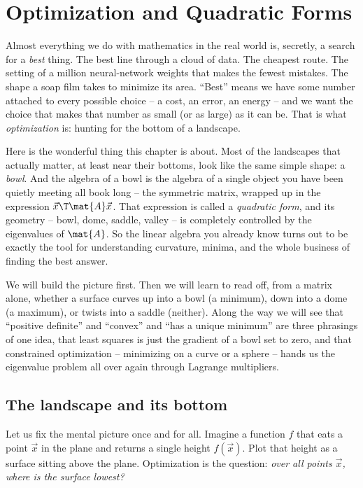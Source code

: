 \chapter{Optimization and Quadratic Forms}

Almost everything we do with mathematics in the real world is, secretly, a search
for a \emph{best} thing. The best line through a cloud of data. The cheapest route.
The setting of a million neural-network weights that makes the fewest mistakes. The
shape a soap film takes to minimize its area. ``Best'' means we have some number
attached to every possible choice -- a cost, an error, an energy -- and we want the
choice that makes that number as small (or as large) as it can be. That is what
\emph{optimization} is: hunting for the bottom of a landscape.

Here is the wonderful thing this chapter is about. Most of the landscapes that
actually matter, at least near their bottoms, look like the same simple shape: a
\emph{bowl}. And the algebra of a bowl is the algebra of a single object you have
been quietly meeting all book long -- the symmetric matrix, wrapped up in the
expression $\vec{x}\T\mat{A}\vec{x}$. That expression is called a \emph{quadratic
form}, and its geometry -- bowl, dome, saddle, valley -- is completely controlled by
the eigenvalues of $\mat{A}$. So the linear algebra you already know turns out to be
exactly the tool for understanding curvature, minima, and the whole business of
finding the best answer.

We will build the picture first. Then we will learn to read off, from a matrix
alone, whether a surface curves up into a bowl (a minimum), down into a dome (a
maximum), or twists into a saddle (neither). Along the way we will see that
``positive definite'' and ``convex'' and ``has a unique minimum'' are three phrasings
of one idea, that least squares is just the gradient of a bowl set to zero, and that
constrained optimization -- minimizing on a curve or a sphere -- hands us the
eigenvalue problem all over again through Lagrange multipliers.

\section{The landscape and its bottom}
\label{ch36:landscape}

Let us fix the mental picture once and for all. Imagine a function $f$ that eats a
point $\vec{x}$ in the plane and returns a single height $f(\vec{x})$. Plot that
height as a surface sitting above the plane. Optimization is the question: \emph{over
all points $\vec{x}$, where is the surface lowest?}

